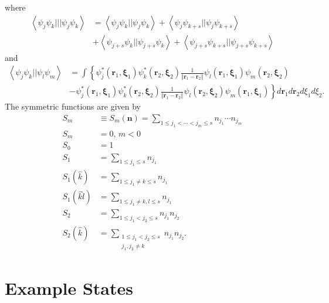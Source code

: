 \documentclass[aps,preprint]{revtex4}%
\begin{document}
where
\begin{align*}
\left\langle \psi_{j}\psi_{k}|||\psi_{j}\psi_{k}\right\rangle  &
=\left\langle \psi_{j}\psi_{k}||\psi_{j}\psi_{k}\right\rangle +\left\langle
\psi_{j}\psi_{k+s}||\psi_{j}\psi_{k+s}\right\rangle \\
&  +\left\langle \psi_{j+s}\psi_{k}||\psi_{j+s}\psi_{k}\right\rangle
+\left\langle \psi_{j+s}\psi_{k+s}||\psi_{j+s}\psi_{k+s}\right\rangle
\end{align*}
and
\begin{align*}
\left\langle \psi_{j}\psi_{k}||\psi_{l}\psi_{m}\right\rangle  &  =\int\left\{
\psi_{j}^{\ast}\left(  \mathbf{r}_{1}\mathbf{,\xi}_{1}\right)  \psi_{k}^{\ast
}\left(  \mathbf{r}_{2}\mathbf{,\xi}_{2}\right)  \frac{1}{\left\Vert
\mathbf{r}_{1}-\mathbf{r}_{2}\right\Vert }\psi_{l}\left(  \mathbf{r}%
_{1}\mathbf{,\xi}_{1}\right)  \psi_{m}\left(  \mathbf{r}_{2}\mathbf{,\xi}%
_{2}\right)  \right. \\
&  -\left.  \psi_{j}^{\ast}\left(  \mathbf{r}_{1}\mathbf{,\xi}_{1}\right)
\psi_{k}^{\ast}\left(  \mathbf{r}_{2}\mathbf{,\xi}_{2}\right)  \frac
{1}{\left\Vert \mathbf{r}_{1}-\mathbf{r}_{2}\right\Vert }\psi_{l}\left(
\mathbf{r}_{2}\mathbf{,\xi}_{2}\right)  \psi_{m}\left(  \mathbf{r}%
_{1}\mathbf{,\xi}_{1}\right)  \right\}  d\mathbf{r}_{1}d\mathbf{r}_{2}d\xi
_{1}d\xi_{2}.
\end{align*}
The symmetric functions are given by
\begin{align*}
S_{m}  &  \equiv S_{m}\left(  \mathbf{n}\right)  =\sum_{1\leq j_{1}%
<\cdots<j_{m}\leq s}n_{j_{1}}\cdots n_{j_{m}}\\
S_{m}  &  =0,\,m<0\\
S_{0}  &  =1\\
S_{1}  &  =\sum_{1\leq j_{1}\leq s}n_{j_{1}}\\
S_{1}\left(  \hat{k}\right)   &  =\sum_{1\leq j_{1}\neq k\leq s}n_{j_{1}}\\
S_{1}\left(  \hat{k}\hat{l}\right)   &  =\sum_{1\leq j_{1}\neq k,l\leq
s}n_{j_{1}}\\
S_{2}  &  =\sum_{1\leq j_{1}<j_{2}\leq s}n_{j_{1}}n_{j_{2}}\\
S_{2}\left(  \hat{k}\right)   &  =\sum_{\substack{1\leq j_{1}<j_{2}\leq
s\\j_{1},j_{2}\neq k}}n_{j_{1}}n_{j_{2}}.
\end{align*}


\section{Example States}
\end{document}
